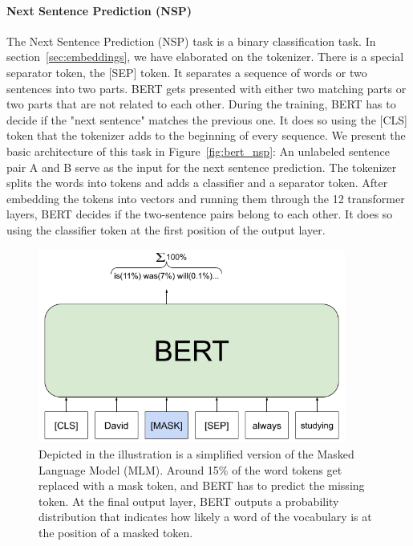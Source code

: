 \paragraph{Next Sentence Prediction (NSP)}
The Next Sentence Prediction (NSP) task is a binary classification task. In section~\ref{sec:embeddings}, we have elaborated on the tokenizer. There is a special separator token, the [SEP] token. It separates a sequence of words or two sentences into two parts. BERT gets presented with either two matching parts or two parts that are not related to each other. During the training, BERT has to decide if the "next sentence" matches the previous one. It does so using the [CLS] token that the tokenizer adds to the beginning of every sequence. We present the basic architecture of this task in Figure~\ref{fig:bert_nsp}: An unlabeled sentence pair A and B serve as the input for the next sentence prediction. The tokenizer splits the words into tokens and adds a classifier and a separator token. After embedding the tokens into vectors and running them through the 12 transformer layers, BERT decides if the two-sentence pairs belong to each other. It does so using the classifier token at the first position of the output layer. 

\begin{figure}[htbp]
\centering
\includegraphics[width=0.9\textwidth]{images/illustrations/bert_mlm.png}
\caption{Depicted in the illustration is a simplified version of the Masked Language Model (MLM). Around 15\% of the word tokens get replaced with a mask token, and BERT has to predict the missing token. At the final output layer, BERT outputs a probability distribution that indicates how likely a word of the vocabulary is at the position of a masked token.}
\label{fig:bert_mlm}
\end{figure}

